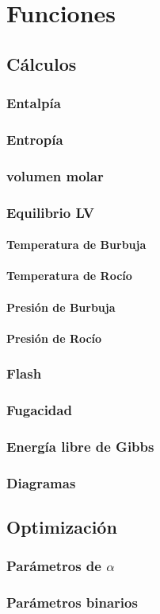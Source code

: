 \chapter{Funciones}
	\section{Cálculos}
		\subsection{Entalpía}
		\subsection{Entropía}
		\subsection{volumen molar}
		\subsection{Equilibrio LV}
			\subsubsection{Temperatura de Burbuja}
			\subsubsection{Temperatura de Rocío}
			\subsubsection{Presión de Burbuja}
			\subsubsection{Presión de Rocío}
		\subsection{Flash}
		\subsection{Fugacidad}
		\subsection{Energía libre de Gibbs}
		\subsection{Diagramas}
	\section{Optimización}	
		\subsection{Parámetros de $\alpha$}
		\subsection{Parámetros binarios}
